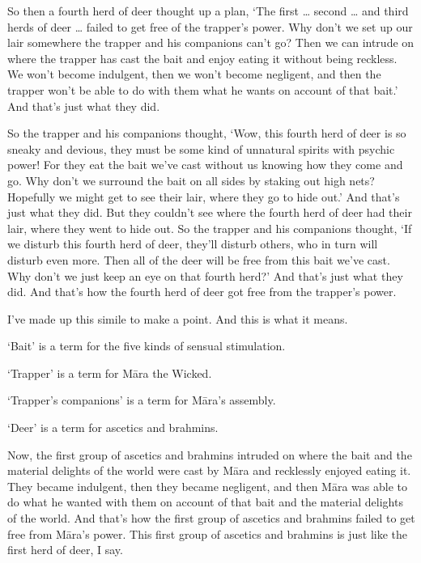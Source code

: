 \documentclass[12pt,openany]{book}%
\begin{document}
So then a fourth herd of deer thought up a plan, ‘The first … second … and third herds of deer … failed to get free of the trapper’s power. Why don’t we set up our lair somewhere the trapper and his companions can’t go? Then we can intrude on where the trapper has cast the bait and enjoy eating it without being reckless. We won’t become indulgent, then we won’t become negligent, and then the trapper won’t be able to do with them what he wants on account of that bait.’ And that’s just what they did. 

So the trapper and his companions thought, ‘Wow, this fourth herd of deer is so sneaky and devious, they must be some kind of unnatural spirits with psychic power! For they eat the bait we’ve cast without us knowing how they come and go. Why don’t we surround the bait on all sides by staking out high nets? Hopefully we might get to see their lair, where they go to hide out.’ And that’s just what they did. But they couldn’t see where the fourth herd of deer had their lair, where they went to hide out. So the trapper and his companions thought, ‘If we disturb this fourth herd of deer, they’ll disturb others, who in turn will disturb even more. Then all of the deer will be free from this bait we’ve cast. Why don’t we just keep an eye on that fourth herd?’ And that’s just what they did. And that’s how the fourth herd of deer got free from the trapper’s power. 

I’ve made up this simile to make a point. And this is what it means. 

‘Bait’ is a term for the five kinds of sensual stimulation. 

‘Trapper’ is a term for \textsanskrit{Māra} the Wicked. 

‘Trapper’s companions’ is a term for \textsanskrit{Māra}’s assembly. 

‘Deer’ is a term for ascetics and brahmins. 

Now, the first group of ascetics and brahmins intruded on where the bait and the material delights of the world were cast by \textsanskrit{Māra} and recklessly enjoyed eating it. They became indulgent, then they became negligent, and then \textsanskrit{Māra} was able to do what he wanted with them on account of that bait and the material delights of the world. And that’s how the first group of ascetics and brahmins failed to get free from \textsanskrit{Māra}’s power. This first group of ascetics and brahmins is just like the first herd of deer, I say. 
\end{document}
